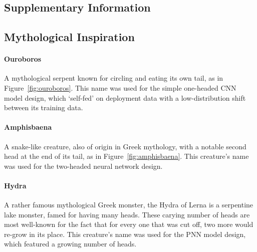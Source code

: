 \begin{uomappendix}
        \section{Supplementary Information}
    
            \subsection{Mythological Inspiration} \label{app:Greek}
    
                \paragraph{Ouroboros} A mythological serpent known for circling and eating its own tail, as in Figure~\ref{fig:ouroboros}. This name was used for the simple one-headed CNN model design, which `self-fed' on deployment data with a low-distribution shift between its training data.
    
                \paragraph{Amphisbaena} A snake-like creature, also of origin in Greek mythology, with a notable second head at the end of its tail, as in Figure~\ref{fig:amphisbaena}. This creature's name was used for the two-headed neural network design.
    
                \paragraph{Hydra} A rather famous mythological Greek monster, the Hydra of Lerna is a serpentine lake monster, famed for having many heads. These carying number of heads are most well-known for the fact that for every one that was cut off, two more would re-grow in its place. This creature's name was used for the PNN model design, which featured a growing number of heads.
    

\end{uomappendix}
